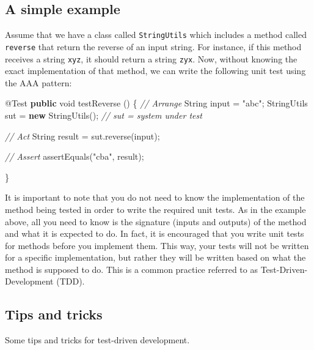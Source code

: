 \documentclass[
]{book}
\newenvironment{Shaded}{\begin{snugshade}}{\end{snugshade}}
\newcommand{\AttributeTok}[1]{\textcolor[rgb]{0.77,0.63,0.00}{#1}}
\newcommand{\BuiltInTok}[1]{#1}
\newcommand{\CommentTok}[1]{\textcolor[rgb]{0.56,0.35,0.01}{\textit{#1}}}
\newcommand{\DataTypeTok}[1]{\textcolor[rgb]{0.13,0.29,0.53}{#1}}
\newcommand{\FunctionTok}[1]{\textcolor[rgb]{0.00,0.00,0.00}{#1}}
\newcommand{\KeywordTok}[1]{\textcolor[rgb]{0.13,0.29,0.53}{\textbf{#1}}}
\newcommand{\NormalTok}[1]{#1}
\newcommand{\StringTok}[1]{\textcolor[rgb]{0.31,0.60,0.02}{#1}}
\begin{document}
\hypertarget{a-simple-example}{%
\subsection{A simple example}\label{a-simple-example}}

Assume that we have a class called \texttt{StringUtils} which includes a method called \texttt{reverse} that return the reverse of an input string. For instance, if this method receives a string \texttt{xyz}, it should return a string \texttt{zyx}. Now, without knowing the exact implementation of that method, we can write the following unit test using the AAA pattern:

\begin{Shaded}
\begin{Highlighting}[]
\AttributeTok{@Test}
\KeywordTok{public} \DataTypeTok{void} \FunctionTok{testReverse}\NormalTok{ () \{}
    \CommentTok{// Arrange}
    \BuiltInTok{String}\NormalTok{ input = }\StringTok{"abc"}\NormalTok{;}
\NormalTok{    StringUtils sut = }\KeywordTok{new} \FunctionTok{StringUtils}\NormalTok{(); }\CommentTok{// sut = system under test}

    \CommentTok{// Act}
    \BuiltInTok{String}\NormalTok{ result = sut.}\FunctionTok{reverse}\NormalTok{(input);}

    \CommentTok{// Assert}
    \FunctionTok{assertEquals}\NormalTok{(}\StringTok{"cba"}\NormalTok{, result);}

\NormalTok{\}}
\end{Highlighting}
\end{Shaded}

It is important to note that you do not need to know the implementation of the method being tested in order to write the required unit tests. As in the example above, all you need to know is the signature (inputs and outputs) of the method and what it is expected to do. In fact, it is encouraged that you write unit tests for methods before you implement them. This way, your tests will not be written for a specific implementation, but rather they will be written based on what the method is supposed to do. This is a common practice referred to as Test-Driven-Development (TDD). \citep{unittesting}

\hypertarget{tricks}{%
\subsection{Tips and tricks}\label{tricks}}

Some tips and tricks for test-driven development.
\end{document}
